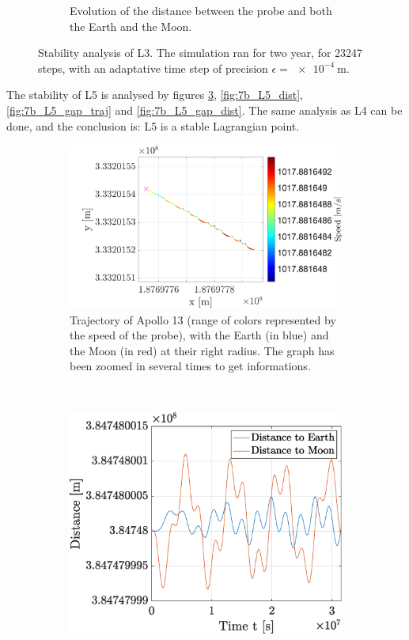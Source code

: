 \documentclass[a4paper,12pt,twoside]{article}
\begin{document}
\begin{figure}[h]
\begin{subfigure}[t]{0.4\textwidth}
    \caption{Evolution of the distance between the probe and both the Earth and the Moon.}
    \label{fig:7b_L3_dist}
  \end{subfigure}
  \caption{Stability analysis of L3. The simulation ran for two year, for \num{23247} steps, with an adaptative time step of precision $\epsilon = \SI{e-4}{\m}$.}
  \label{fig:7b_L3}
\end{figure}

The stability of L5 is analysed by figures \ref{fig:7b_L5_traj}, \ref{fig:7b_L5_dist}, \ref{fig:7b_L5_gap_traj} and \ref{fig:7b_L5_gap_dist}.
The same analysis as L4 can be done, and the conclusion is: L5 is a stable Lagrangian point.

\begin{figure}[h]
  \centering
  \begin{subfigure}[t]{0.55\textwidth}
    \includegraphics[width=\textwidth]{graphs/ex7b_L5_stab_close.png}
    \caption{Trajectory of Apollo 13 (range of colors represented by the speed of the probe), with the Earth (in blue) and the Moon (in red) at their right radius. The graph has been zoomed in several times to get informations.}
    \label{fig:7b_L5_traj}
  \end{subfigure}
  ~
  \begin{subfigure}[t]{0.4\textwidth}
    \includegraphics[width=\textwidth]{graphs/ex7b_L5_dist.eps}

\end{subfigure}
\end{figure}
\end{document}
